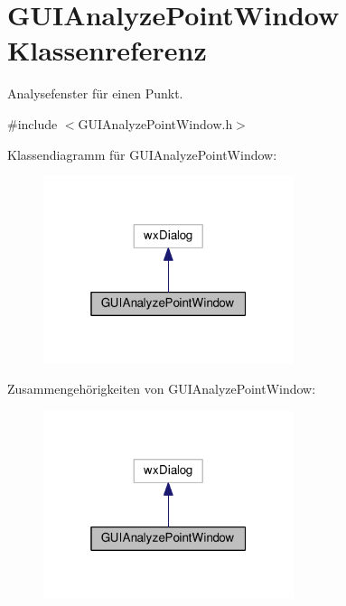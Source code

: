\hypertarget{classGUIAnalyzePointWindow}{\section{G\-U\-I\-Analyze\-Point\-Window Klassenreferenz}
\label{classGUIAnalyzePointWindow}
}


Analysefenster für einen Punkt.  




{\ttfamily \#include $<$G\-U\-I\-Analyze\-Point\-Window.\-h$>$}



Klassendiagramm für G\-U\-I\-Analyze\-Point\-Window\-:
\nopagebreak
\begin{figure}[H]
\begin{center}
\leavevmode
\includegraphics[width=208pt]{classGUIAnalyzePointWindow__inherit__graph}
\end{center}
\end{figure}


Zusammengehörigkeiten von G\-U\-I\-Analyze\-Point\-Window\-:
\nopagebreak
\begin{figure}[H]
\begin{center}
\leavevmode
\includegraphics[width=208pt]{classGUIAnalyzePointWindow__coll__graph}
\end{center}
\end{figure}
